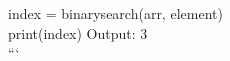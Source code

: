\documentclass[preview]{standalone}
\begin{document}
index = binarysearch(arr, element)\\print(index)   Output: 3\\```\\
\end{document}
